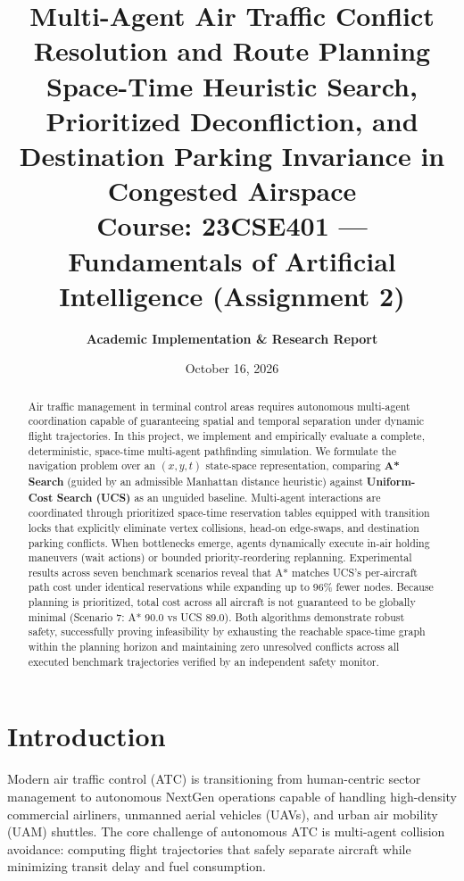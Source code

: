 \documentclass[11pt,a4paper]{article}
\title{\textbf{Multi-Agent Air Traffic Conflict Resolution and Route Planning}\\
\large Space-Time Heuristic Search, Prioritized Deconfliction, and Destination Parking Invariance in Congested Airspace\\
\vspace{0.3cm}
\normalsize Course: 23CSE401 — Fundamentals of Artificial Intelligence (Assignment 2)}
\author{\textbf{Academic Implementation \& Research Report}}
\date{October 16, 2026}
\begin{document}
\maketitle
\thispagestyle{empty}

\begin{abstract}
Air traffic management in terminal control areas requires autonomous multi-agent coordination capable of guaranteeing spatial and temporal separation under dynamic flight trajectories. In this project, we implement and empirically evaluate a complete, deterministic, space-time multi-agent pathfinding simulation. We formulate the navigation problem over an $(x, y, t)$ state-space representation, comparing \textbf{A* Search} (guided by an admissible Manhattan distance heuristic) against \textbf{Uniform-Cost Search (UCS)} as an unguided baseline. Multi-agent interactions are coordinated through prioritized space-time reservation tables equipped with transition locks that explicitly eliminate vertex collisions, head-on edge-swaps, and destination parking conflicts. When bottlenecks emerge, agents dynamically execute in-air holding maneuvers (wait actions) or bounded priority-reordering replanning. Experimental results across seven benchmark scenarios reveal that A* matches UCS's per-aircraft path cost under identical reservations while expanding up to 96\% fewer nodes. Because planning is prioritized, total cost across all aircraft is not guaranteed to be globally minimal (Scenario 7: A* 90.0 vs UCS 89.0). Both algorithms demonstrate robust safety, successfully proving infeasibility by exhausting the reachable space-time graph within the planning horizon and maintaining zero unresolved conflicts across all executed benchmark trajectories verified by an independent safety monitor.
\end{abstract}

\vspace{0.5cm}
\tableofcontents
\newpage

\section{Introduction}
Modern air traffic control (ATC) is transitioning from human-centric sector management to autonomous NextGen operations capable of handling high-density commercial airliners, unmanned aerial vehicles (UAVs), and urban air mobility (UAM) shuttles. The core challenge of autonomous ATC is multi-agent collision avoidance: computing flight trajectories that safely separate aircraft while minimizing transit delay and fuel consumption.
\end{document}
